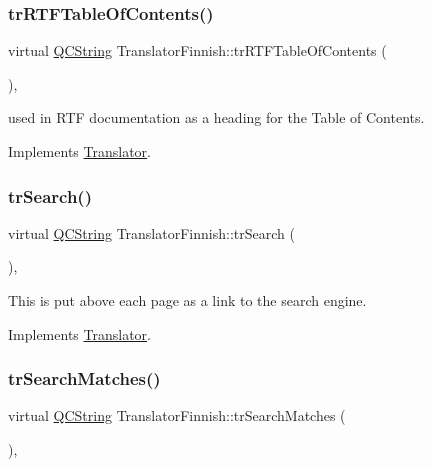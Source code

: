 \mbox{\label{class_translator_finnish_a0ba150ac95ad9b55e7b4126685685c26}} 
\subsubsection{\texorpdfstring{trRTFTableOfContents()}{trRTFTableOfContents()}}
{\footnotesize\ttfamily virtual \mbox{\hyperlink{class_q_c_string}{Q\+C\+String}} Translator\+Finnish\+::tr\+R\+T\+F\+Table\+Of\+Contents (\begin{DoxyParamCaption}{ }\end{DoxyParamCaption})\hspace{0.3cm}{\ttfamily [inline]}, {\ttfamily [virtual]}}

used in R\+TF documentation as a heading for the Table of Contents. 

Implements \mbox{\hyperlink{class_translator}{Translator}}.

\mbox{\label{class_translator_finnish_aac0670963b0df3c27cb48019ab85ac22}} 
\subsubsection{\texorpdfstring{trSearch()}{trSearch()}}
{\footnotesize\ttfamily virtual \mbox{\hyperlink{class_q_c_string}{Q\+C\+String}} Translator\+Finnish\+::tr\+Search (\begin{DoxyParamCaption}{ }\end{DoxyParamCaption})\hspace{0.3cm}{\ttfamily [inline]}, {\ttfamily [virtual]}}

This is put above each page as a link to the search engine. 

Implements \mbox{\hyperlink{class_translator}{Translator}}.

\mbox{\label{class_translator_finnish_a35cd17739cbf42e9474f50ceafe418c2}} 
\subsubsection{\texorpdfstring{trSearchMatches()}{trSearchMatches()}}
{\footnotesize\ttfamily virtual \mbox{\hyperlink{class_q_c_string}{Q\+C\+String}} Translator\+Finnish\+::tr\+Search\+Matches (\begin{DoxyParamCaption}{ }\end{DoxyParamCaption})\hspace{0.3cm}{\ttfamily [inline]}, {\ttfamily [virtual]}}


